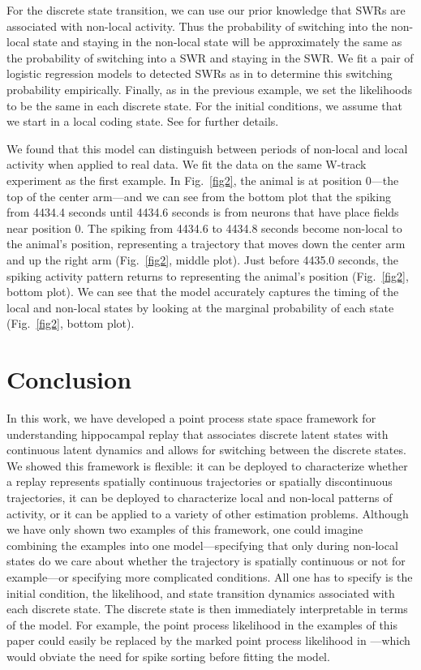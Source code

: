 \documentclass[conference]{IEEEtran}
\begin{document}
For the discrete state transition, we can use our prior knowledge that SWRs are associated with non-local activity. Thus the probability of switching into the non-local state and staying in the non-local state will be approximately the same as the probability of switching into a SWR and staying in the SWR. We fit a pair of logistic regression models to detected SWRs as in \cite{EdenCharacterizingComplexMultiScale2018} to determine this switching probability empirically.
Finally, as in the previous example, we set the likelihoods to be the same in each discrete state. For the initial conditions, we assume that we start in a local coding state. See \cite{EdenCharacterizingComplexMultiScale2018} for further details.

We found that this model can distinguish between periods of non-local and local activity when applied to real data. We fit the data on the same W-track experiment as the first example. In  Fig.~\ref{fig2}, the animal is at position 0---the top of the center arm---and we can see from the bottom plot that the spiking from 4434.4 seconds until 4434.6 seconds is from neurons that have place fields near position 0. The spiking from 4434.6 to 4434.8 seconds become non-local to the animal's position, representing a trajectory that moves down the center arm and up the right arm (Fig.~\ref{fig2}, middle plot). Just before 4435.0 seconds, the spiking activity pattern returns to representing the animal's position (Fig.~\ref{fig2}, bottom plot). We can see that the model accurately captures the timing of the local and non-local states by looking at the marginal probability of each state (Fig.~\ref{fig2}, bottom plot).

\section{Conclusion}
In this work, we have developed a point process state space framework for understanding hippocampal replay that associates discrete latent states with continuous latent dynamics and allows for switching between the discrete states. We showed this framework is flexible: it can be deployed to characterize whether a replay represents spatially continuous trajectories or spatially discontinuous trajectories, it can be deployed to characterize local and non-local patterns of activity, or it can be applied to a variety of other estimation problems. Although we have only shown two examples of this framework, one could imagine combining the examples into one model---specifying that only during non-local states do we care about whether the trajectory is spatially continuous or not for example---or specifying more complicated conditions. All one has to specify is the initial condition, the likelihood, and state transition dynamics associated with each discrete state. The discrete state is then immediately interpretable in terms of the model. For example, the point process likelihood in the examples of this paper could easily be replaced by the marked point process likelihood in \cite{DengRapidclassificationhippocampal2016}---which would obviate the need for spike sorting before fitting the model.
\end{document}
